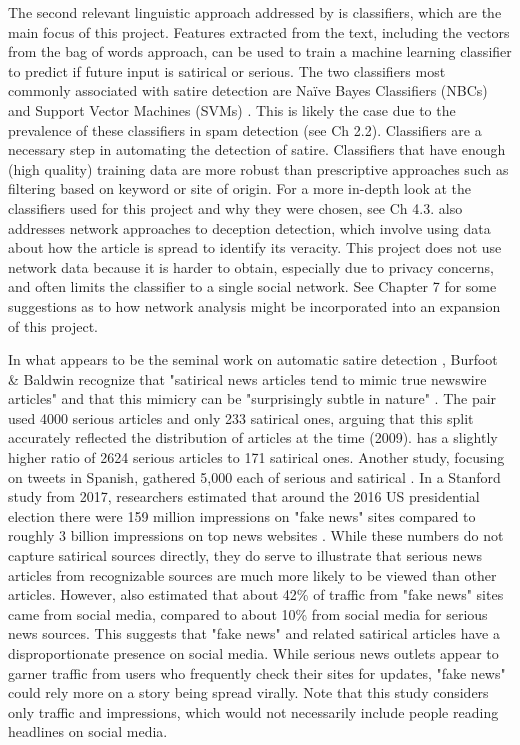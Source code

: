 \documentclass [12 pt] {report}
\begin{document}
The second relevant linguistic approach addressed by \cite{Methods} is classifiers, which are the main focus of this project. Features extracted from the text, including the vectors from the bag of words approach, can be used to train a machine learning classifier to predict if future input is satirical or serious. The two classifiers most commonly associated with satire detection are Na{\"i}ve Bayes Classifiers (NBCs) and Support Vector Machines (SVMs) \cite{Burfoot}\cite{Methods} \cite{Mining} \cite{Twitter}. This is likely the case due to the prevalence of these classifiers in spam detection (see Ch 2.2). Classifiers are a necessary step in automating the detection of satire. Classifiers that have enough (high quality) training data are more robust than prescriptive approaches such as filtering based on keyword or site of origin. For a more in-depth look at the classifiers used for this project and why they were chosen, see Ch 4.3. \cite{Methods} also addresses network approaches to deception detection, which involve using data about how the article is spread to identify its veracity. This project does not use network data because it is harder to obtain, especially due to privacy concerns, and often limits the classifier to a single social network. See Chapter 7 for some suggestions as to how network analysis might be incorporated into an expansion of this project.
	
In what appears to be the seminal work on automatic satire detection \cite{Burfoot}, Burfoot \& Baldwin recognize that "satirical news articles tend to mimic true newswire articles" and that this mimicry can be "surprisingly subtle in nature" \cite{Burfoot}. The pair used 4000 serious articles and only 233 satirical ones, arguing that this split accurately reflected the distribution of articles at the time (2009).\cite{Ahmad} has a slightly higher ratio of 2624 serious articles to 171 satirical ones. Another study, focusing on tweets in Spanish, gathered 5,000 each of serious and satirical \cite{Twitter}. In a Stanford study from 2017, researchers estimated that around the 2016 US presidential election there were 159 million impressions on "fake news" sites compared to roughly 3 billion impressions on top news websites \cite{electionNews}. While these numbers do not capture satirical sources directly, they do serve to illustrate that serious news articles from recognizable sources are much more likely to be viewed than other articles. However, \cite{electionNews} also estimated that about 42\% of traffic from "fake news" sites came from social media, compared to about 10\% from social media for serious news sources. This suggests that "fake news" and related satirical articles have a disproportionate presence on social media. While serious news outlets appear to garner traffic from users who frequently check their sites for updates, "fake news" could rely more on a story being spread virally. Note that this study considers only traffic and impressions, which would not necessarily include people reading headlines on social media.
	
\end{document}

